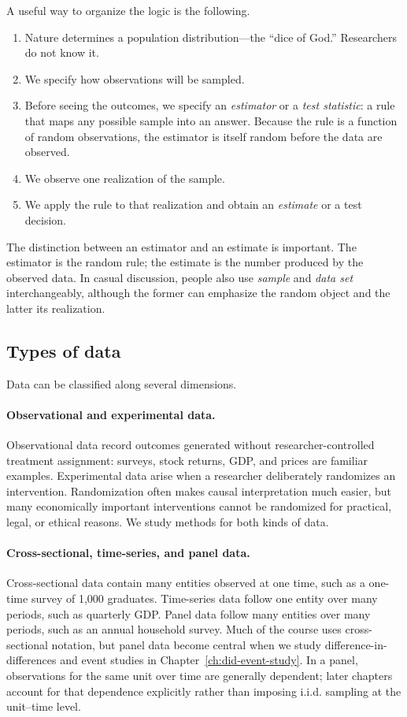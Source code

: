 A useful way to organize the logic is the following.
\begin{enumerate}
  \item Nature determines a population distribution---the ``dice of God.''
        Researchers do not know it.
  \item We specify how observations will be sampled.
  \item Before seeing the outcomes, we specify an \emph{estimator} or a
        \emph{test statistic}: a rule that maps any possible sample into an
        answer.  Because the rule is a function of random observations, the
        estimator is itself random before the data are observed.
  \item We observe one realization of the sample.
  \item We apply the rule to that realization and obtain an \emph{estimate}
        or a test decision.
\end{enumerate}
The distinction between an estimator and an estimate is important.  The
estimator is the random rule; the estimate is the number produced by the
observed data.  In casual discussion, people also use \emph{sample} and
\emph{data set} interchangeably, although the former can emphasize the random
object and the latter its realization.

\subsection{Types of data}

Data can be classified along several dimensions.

\paragraph{Observational and experimental data.}
Observational data record outcomes generated without researcher-controlled
treatment assignment: surveys, stock returns, GDP, and prices are familiar
examples.  Experimental data arise when a researcher deliberately randomizes
an intervention.  Randomization often makes causal interpretation much
easier, but many economically important interventions cannot be randomized
for practical, legal, or ethical reasons.  We study methods for both kinds of
data.

\paragraph{Cross-sectional, time-series, and panel data.}
Cross-sectional data contain many entities observed at one time, such as a
one-time survey of 1,000 graduates.  Time-series data follow one entity over
many periods, such as quarterly GDP.  Panel data follow many entities over
many periods, such as an annual household survey.  Much of the course uses
cross-sectional notation, but panel data become central when we study
difference-in-differences and event studies in
Chapter~\ref{ch:did-event-study}.  In a panel, observations for the same unit
over time are generally dependent; later chapters account for that dependence
explicitly rather than imposing i.i.d. sampling at the unit--time level.

